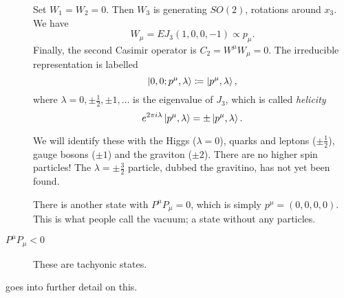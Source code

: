 \begin{description}
\begin{remark}
    \end{remark}
    Set $W_1 = W_2 = 0$. Then $W_3$ is generating $SO(2)$, rotations around $x_3$.
    We have
    \begin{equation}
      W_{\mu} = E J_3 (1, 0, 0, -1) \propto p_{\mu}.
    \end{equation}
    Finally, the second Casimir operator is $C_2 = W^{\mu} W_{\mu} = 0$.
    The irreducible representation is labelled
    \begin{equation}
      \ket{0, 0; p^{\mu}, \lambda} \coloneqq \ket{p^{\mu}, \lambda}, 
    \end{equation}
    where $\lambda = 0, \pm \frac{1}{2}, \pm 1, \dots$ is the eigenvalue of $J_3$, which is called \emph{helicity}
    \begin{equation}
      e^{2 \pi i \lambda} \ket{p^{\mu}, \lambda} = \pm \ket{p^{\mu}, \lambda}.
    \end{equation}
    \begin{remark}
      We will identify these with the Higgs ($\lambda = 0$), quarks and leptons ($\pm \frac{1}{2}$), gauge bosons ($\pm 1$) and the graviton ($\pm 2$). There are no higher spin particles!
      The $\lambda = \pm \frac{3}{2}$ particle, dubbed the gravitino, has not yet been found.
    \end{remark}
    \begin{remark}
      There is another state with $P^{\mu} P_{\mu} = 0$, which is simply $p^{\mu} = (0,0,0,0)$. This is what people call the vacuum; a state without any particles.
    \end{remark}
  \item[$P^{\mu} P_{\mu} < 0$] These are tachyonic states.
\end{description}

\begin{remark}
  \cite[Chapter 2]{weinberg} goes into further detail on this.
\end{remark}

